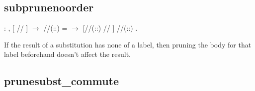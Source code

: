 \documentclass[12pt]{report}
\begin{document}
\begin{prooftree}
\end{prooftree}

\begin{prooftree}
\end{prooftree}

\begin{prooftree}
\end{prooftree}
\begin{coqdoccode}
\coqdocemptyline
\coqdocemptyline
\coqdocemptyline
\end{coqdoccode}
\subsection{subprunenoorder}

\begin{coqdoccode}
\coqdocemptyline
\coqdocindent{1.00em}
  : \coqdockw{\ensuremath{\forall}}     ,\coqdoceol
\coqdocindent{2.00em}
[ // ]    \ensuremath{\rightarrow}\coqdoceol
\coqdocindent{2.00em}
//\coqdocvar{\_}(::) =  \ensuremath{\rightarrow}\coqdoceol
\coqdocindent{2.00em}
[//\coqdocvar{\_}(::) // ] //\coqdocvar{\_}(::)  .\coqdoceol
\coqdocemptyline
\end{coqdoccode}
If the result of a substitution has none of a label, then pruning
the body for that label beforehand doesn't affect the result. 

\subsection{prunesubst\_commute}
\end{document}
